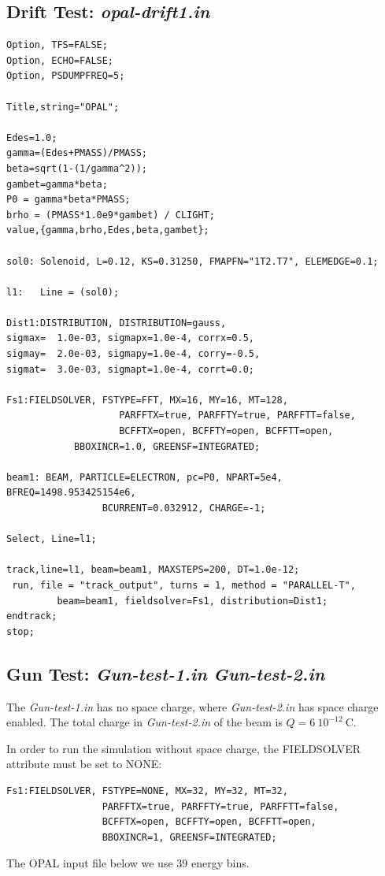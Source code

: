\documentclass{psi-note}    %
\begin{document}
\subsection{Drift Test: {\it opal-drift1.in}}
\begin{verbatim}
Option, TFS=FALSE;
Option, ECHO=FALSE;
Option, PSDUMPFREQ=5;

Title,string="OPAL";

Edes=1.0;
gamma=(Edes+PMASS)/PMASS;
beta=sqrt(1-(1/gamma^2));
gambet=gamma*beta;
P0 = gamma*beta*PMASS;
brho = (PMASS*1.0e9*gambet) / CLIGHT;
value,{gamma,brho,Edes,beta,gambet};

sol0: Solenoid, L=0.12, KS=0.31250, FMAPFN="1T2.T7", ELEMEDGE=0.1;

l1:   Line = (sol0);

Dist1:DISTRIBUTION, DISTRIBUTION=gauss,
sigmax=  1.0e-03, sigmapx=1.0e-4, corrx=0.5,
sigmay=  2.0e-03, sigmapy=1.0e-4, corry=-0.5,
sigmat=  3.0e-03, sigmapt=1.0e-4, corrt=0.0;

Fs1:FIELDSOLVER, FSTYPE=FFT, MX=16, MY=16, MT=128,
                 	PARFFTX=true, PARFFTY=true, PARFFTT=false,
                 	BCFFTX=open, BCFFTY=open, BCFFTT=open,
     		BBOXINCR=1.0, GREENSF=INTEGRATED;

beam1: BEAM, PARTICLE=ELECTRON, pc=P0, NPART=5e4, BFREQ=1498.953425154e6, 
		         BCURRENT=0.032912, CHARGE=-1;

Select, Line=l1;

track,line=l1, beam=beam1, MAXSTEPS=200, DT=1.0e-12;
 run, file = "track_output", turns = 1, method = "PARALLEL-T", 
         beam=beam1, fieldsolver=Fs1, distribution=Dist1;
endtrack;
stop;
\end{verbatim}

\subsection{Gun Test: {\it Gun-test-1.in} {\it Gun-test-2.in}}
The {\it Gun-test-1.in} has no space charge, where {\it Gun-test-2.in} has space
charge enabled. The total charge in {\it Gun-test-2.in} of the beam is $Q=6
~10^{-12}~ \mbox{C}$.

In order to run the simulation without space charge, the FIELDSOLVER attribute
must be set to NONE:
\begin{verbatim}
Fs1:FIELDSOLVER, FSTYPE=NONE, MX=32, MY=32, MT=32, 
                 PARFFTX=true, PARFFTY=true, PARFFTT=false,
                 BCFFTX=open, BCFFTY=open, BCFFTT=open, 
                 BBOXINCR=1, GREENSF=INTEGRATED;
\end{verbatim}
The OPAL input file below we use 39 energy bins.
\end{document}
